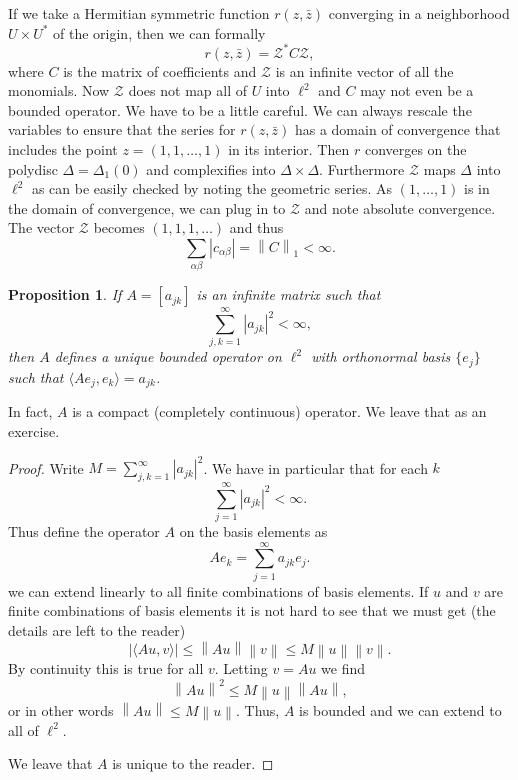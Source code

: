 \documentclass[12pt,openany]{book}
\newcommand{\abs}[1]{\left\lvert {#1} \right\rvert}
\newcommand{\norm}[1]{\left\lVert {#1} \right\rVert}
\newcommand{\sZ}{{\mathcal{Z}}}
\theoremstyle{plain}
\newtheorem{prop}[thm]{Proposition}
\theoremstyle{remark}
\theoremstyle{definition}
\theoremstyle{exercise}
\theoremstyle{example}
\begin{document}
If we take a Hermitian symmetric function $r(z,\bar{z})$ converging
in a neighborhood $U \times U^*$ of the origin, then we can formally
\begin{equation}
r(z,\bar{z}) = \sZ^* C \sZ ,
\end{equation}
where $C$ is the matrix of coefficients and $\sZ$ is an infinite vector
of all the monomials.  Now $\sZ$ does not map all of $U$ into $\ell^2$
and $C$ may not even be a bounded operator.  We have to be a little careful.
We can always rescale the variables to ensure that the series for
$r(z,\bar{z})$ has a domain of convergence that includes the point
$z=(1,1,\ldots,1)$ in its interior.
Then $r$ converges on the polydisc $\Delta =
\Delta_1(0)$ and complexifies into $\Delta \times \Delta$.  Furthermore
$\sZ$ maps $\Delta$ into $\ell^2$ as can be easily checked by noting the
geometric series.  As
$(1,\ldots,1)$ is in the domain of convergence, we can plug in to $\sZ$
and note absolute convergence.  The vector $\sZ$ becomes $(1,1,1,\ldots)$
and thus
\begin{equation}
\sum_{\alpha \beta} \abs{c_{\alpha \beta}} = \norm{C}_1 < \infty .
\end{equation}

\begin{prop} \label{prop:matbndop}
If $A = [a_{jk}]$ is an infinite matrix such that
\begin{equation}
\sum_{j,k = 1}^\infty \abs{a_{jk}}^2 < \infty ,
\end{equation}
then $A$ defines a unique bounded operator on $\ell^2$
with orthonormal basis $\{ e_j \}$ such that
$\langle A e_j , e_k \rangle = a_{jk}$.
\end{prop}

In fact, $A$ is a compact (completely continuous) operator.  We leave that as
an exercise.

\begin{proof}
Write $M= \sum_{j,k = 1}^\infty \abs{a_{jk}}^2$.
We have in particular that for each $k$
\begin{equation}
\sum_{j = 1}^\infty \abs{a_{jk}}^2 < \infty .
\end{equation}
Thus define the operator $A$ on the basis elements as
\begin{equation}
A e_k = \sum_{j=1}^\infty a_{jk} e_j .
\end{equation}
we can extend linearly to all finite combinations of basis elements.
If $u$ and $v$ are finite combinations of basis elements it is not hard
to see that we must get
(the details are left to the reader)
\begin{equation}
\abs{\langle A u , v \rangle} \leq
\norm{Au}\norm{v}
\leq
M \norm{u} \norm{v} .
\end{equation}
By continuity this is true for all $v$.  Letting $v=Au$ we find
\begin{equation}
\norm{Au}^2 \leq M \norm{u} \norm{Au},
\end{equation}
or in other words $\norm{Au} \leq M \norm{u}$.  Thus, $A$ is bounded
and we can extend to all of $\ell^2$.

We leave that $A$ is unique to the reader.
\end{proof}
\end{document}
